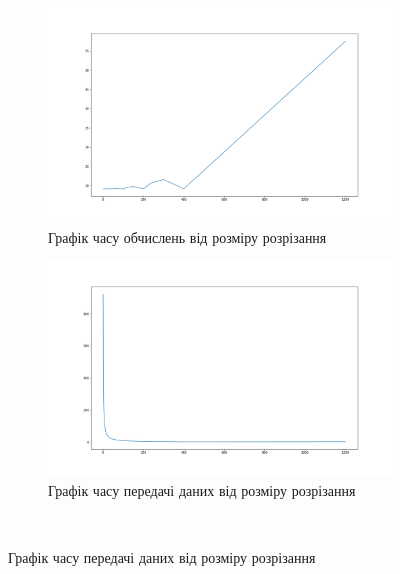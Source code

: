 \begin{figure}[H]
	\centering
	\begin{subfigure}[b]{0.5\linewidth}
		\centering
		\includegraphics[width=\textwidth]{practice/img/processing_time_sep}
		\caption{Графік часу обчислень від розміру розрізання}
		\label{fig:processing_time_sep}
	\end{subfigure}%

	\begin{subfigure}[b]{0.5\linewidth}
		\centering
		\includegraphics[width=\textwidth]{practice/img/transfer_time_sep}
		\caption{Графік часу передачі даних від розміру розрізання}
		\label{fig:transfer_time_sep}
	\end{subfigure}\\


\end{figure}

